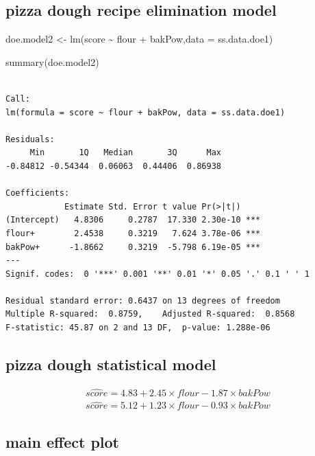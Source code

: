 \documentclass[
  a4paper,
]{scrbook}
\newenvironment{Shaded}{\begin{snugshade}}{\end{snugshade}}
\newcommand{\AttributeTok}[1]{\textcolor[rgb]{0.40,0.45,0.13}{#1}}
\newcommand{\FunctionTok}[1]{\textcolor[rgb]{0.28,0.35,0.67}{#1}}
\newcommand{\NormalTok}[1]{\textcolor[rgb]{0.00,0.23,0.31}{#1}}
\newcommand{\OtherTok}[1]{\textcolor[rgb]{0.00,0.23,0.31}{#1}}
\newcommand{\SpecialCharTok}[1]{\textcolor[rgb]{0.37,0.37,0.37}{#1}}
\begin{document}
\subsection{pizza dough recipe elimination
model}\label{pizza-dough-recipe-elimination-model}

\begin{Shaded}
\begin{Highlighting}[]
\NormalTok{doe.model2 }\OtherTok{\textless{}{-}} \FunctionTok{lm}\NormalTok{(score }\SpecialCharTok{\textasciitilde{}}\NormalTok{ flour }\SpecialCharTok{+}\NormalTok{ bakPow,}\AttributeTok{data =}\NormalTok{ ss.data.doe1)}

\FunctionTok{summary}\NormalTok{(doe.model2)}
\end{Highlighting}
\end{Shaded}

\begin{verbatim}

Call:
lm(formula = score ~ flour + bakPow, data = ss.data.doe1)

Residuals:
     Min       1Q   Median       3Q      Max 
-0.84812 -0.54344  0.06063  0.44406  0.86938 

Coefficients:
            Estimate Std. Error t value Pr(>|t|)    
(Intercept)   4.8306     0.2787  17.330 2.30e-10 ***
flour+        2.4538     0.3219   7.624 3.78e-06 ***
bakPow+      -1.8662     0.3219  -5.798 6.19e-05 ***
---
Signif. codes:  0 '***' 0.001 '**' 0.01 '*' 0.05 '.' 0.1 ' ' 1

Residual standard error: 0.6437 on 13 degrees of freedom
Multiple R-squared:  0.8759,    Adjusted R-squared:  0.8568 
F-statistic: 45.87 on 2 and 13 DF,  p-value: 1.288e-06
\end{verbatim}

\subsection{pizza dough statistical
model}\label{pizza-dough-statistical-model}

\begin{align}
\widehat{score} = 4.83 + 2.45\times flour  -1.87 \times bakPow \\
\widehat{score} = 5.12 + 1.23\times flour  -0.93 \times bakPow
\end{align}

\subsection{main effect plot}\label{main-effect-plot}
\end{document}
